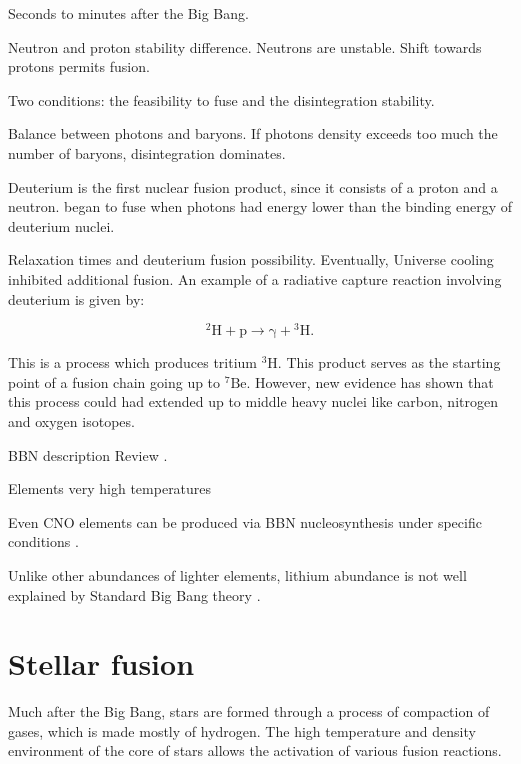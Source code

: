 \documentclass[openany]{book}
\begin{document}
Seconds to minutes after the Big Bang. 

Neutron and proton stability difference. Neutrons are unstable.  Shift towards protons permits fusion. 

Two conditions: the feasibility to fuse and the disintegration stability.

Balance between photons and baryons. If photons density exceeds too much the number of baryons, disintegration dominates. 

Deuterium is the first nuclear fusion product, since it  consists of a proton and a neutron. began to fuse when photons had  energy lower than the binding energy of deuterium nuclei. 

Relaxation times and deuterium fusion possibility. Eventually, Universe cooling inhibited additional fusion. An example of a radiative capture reaction involving deuterium is given by:

\begin{equation} \label{eq:reaction_2Hpradiative}
	\mathrm{{}^{2}H + p \rightarrow \gamma + {}^{3}H}.
\end{equation}

This is a process which produces tritium $\mathrm{{}^{3}H}$. This product serves as the starting point of a fusion chain going up to $\mathrm{{}^{7}Be}$. However, new evidence has shown that this process could had extended up to middle heavy nuclei like carbon, nitrogen and oxygen isotopes.

BBN description \cite{coc_vangioni_2010}
Review \cite{patrignani_et_particle-data-group_2016}.

Elements very high temperatures \cite{wagoner_fowler_hoyle_1967}

Even CNO elements can be produced via BBN nucleosynthesis under specific conditions \cite{su-qing_kai-su_yong-shou_neng-chuan_zhi-hong_2010}.

Unlike other abundances of lighter elements, lithium abundance is not well explained by Standard Big Bang theory \cite{bertulani_2019}. 


\section{Stellar fusion}  \label{sec:StellarFusion}

Much after the Big Bang, stars are formed through a process of compaction of gases, which is made mostly of hydrogen. The high temperature and density environment of the core of stars allows the activation of various fusion reactions.  \\
\end{document}
